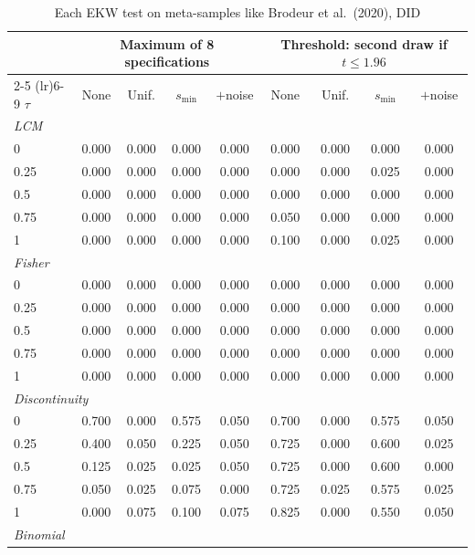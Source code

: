 \begin{table}[htbp]
\centering
\caption{Each EKW test on meta-samples like Brodeur et al.\ (2020), DID}
\label{tab:brodeur_did_power_EKW}
\footnotesize
\setlength{\tabcolsep}{4pt}
\begin{tabular}{lcccccccc}
\toprule
 & \multicolumn{4}{c}{Maximum of 8 specifications} & \multicolumn{4}{c}{Threshold: second draw if $t \le 1.96$} \\
\cmidrule(lr){2-5} \cmidrule(lr){6-9}
$\tau$ & None & Unif. & $s_{\min}$ & $+$noise & None & Unif. & $s_{\min}$ & $+$noise \\
\midrule
\multicolumn{9}{l}{\textit{LCM}} \\
0 & 0.000 & 0.000 & 0.000 & 0.000 & 0.000 & 0.000 & 0.000 & 0.000 \\
0.25 & 0.000 & 0.000 & 0.000 & 0.000 & 0.000 & 0.000 & 0.025 & 0.000 \\
0.5 & 0.000 & 0.000 & 0.000 & 0.000 & 0.000 & 0.000 & 0.000 & 0.000 \\
0.75 & 0.000 & 0.000 & 0.000 & 0.000 & 0.050 & 0.000 & 0.000 & 0.000 \\
1 & 0.000 & 0.000 & 0.000 & 0.000 & 0.100 & 0.000 & 0.025 & 0.000 \\
\midrule
\multicolumn{9}{l}{\textit{Fisher}} \\
0 & 0.000 & 0.000 & 0.000 & 0.000 & 0.000 & 0.000 & 0.000 & 0.000 \\
0.25 & 0.000 & 0.000 & 0.000 & 0.000 & 0.000 & 0.000 & 0.000 & 0.000 \\
0.5 & 0.000 & 0.000 & 0.000 & 0.000 & 0.000 & 0.000 & 0.000 & 0.000 \\
0.75 & 0.000 & 0.000 & 0.000 & 0.000 & 0.000 & 0.000 & 0.000 & 0.000 \\
1 & 0.000 & 0.000 & 0.000 & 0.000 & 0.000 & 0.000 & 0.000 & 0.000 \\
\midrule
\multicolumn{9}{l}{\textit{Discontinuity}} \\
0 & 0.700 & 0.000 & 0.575 & 0.050 & 0.700 & 0.000 & 0.575 & 0.050 \\
0.25 & 0.400 & 0.050 & 0.225 & 0.050 & 0.725 & 0.000 & 0.600 & 0.025 \\
0.5 & 0.125 & 0.025 & 0.025 & 0.050 & 0.725 & 0.000 & 0.600 & 0.000 \\
0.75 & 0.050 & 0.025 & 0.075 & 0.000 & 0.725 & 0.025 & 0.575 & 0.025 \\
1 & 0.000 & 0.075 & 0.100 & 0.075 & 0.825 & 0.000 & 0.550 & 0.050 \\
\midrule
\multicolumn{9}{l}{\textit{Binomial}} \\

\end{tabular}
\end{table}

